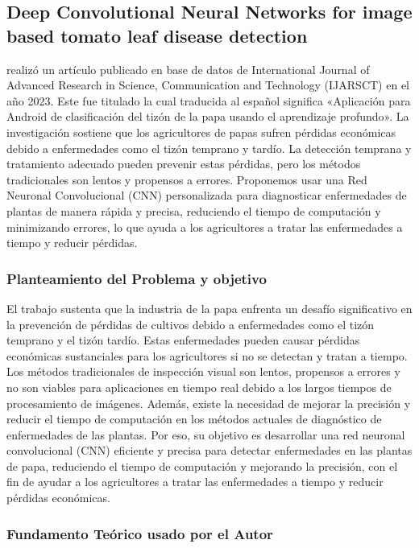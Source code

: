 \subsection{Deep Convolutional Neural Networks for image based tomato leaf disease detection  \citep*{antecedente6}}

\citeauthor{antecedente6} realizó un artículo publicado en base de datos de International Journal of Advanced Research in Science, Communication and Technology (IJARSCT) en el año 2023. Este fue titulado  la cual traducida al español significa «Aplicación para Android de clasificación del tizón de la papa usando el aprendizaje profundo». La investigación sostiene que los agricultores de papas sufren pérdidas económicas debido a enfermedades como el tizón temprano y tardío. La detección temprana y tratamiento adecuado pueden prevenir estas pérdidas, pero los métodos tradicionales son lentos y propensos a errores. Proponemos usar una Red Neuronal Convolucional (CNN) personalizada para diagnosticar enfermedades de plantas de manera rápida y precisa, reduciendo el tiempo de computación y minimizando errores, lo que ayuda a los agricultores a tratar las enfermedades a tiempo y reducir pérdidas.

\subsubsection{Planteamiento del Problema y objetivo }
El trabajo sustenta que la industria de la papa enfrenta un desafío significativo en la prevención de pérdidas de cultivos debido a enfermedades como el tizón temprano y el tizón tardío. Estas enfermedades pueden causar pérdidas económicas sustanciales para los agricultores si no se detectan y tratan a tiempo. Los métodos tradicionales de inspección visual son lentos, propensos a errores y no son viables para aplicaciones en tiempo real debido a los largos tiempos de procesamiento de imágenes. Además, existe la necesidad de mejorar la precisión y reducir el tiempo de computación en los métodos actuales de diagnóstico de enfermedades de las plantas. Por eso, su objetivo es desarrollar una red neuronal convolucional (CNN) eficiente y precisa para detectar enfermedades en las plantas de papa, reduciendo el tiempo de computación y mejorando la precisión, con el fin de ayudar a los agricultores a tratar las enfermedades a tiempo y reducir pérdidas económicas. 

\subsubsection{Fundamento Teórico usado por el Autor}

